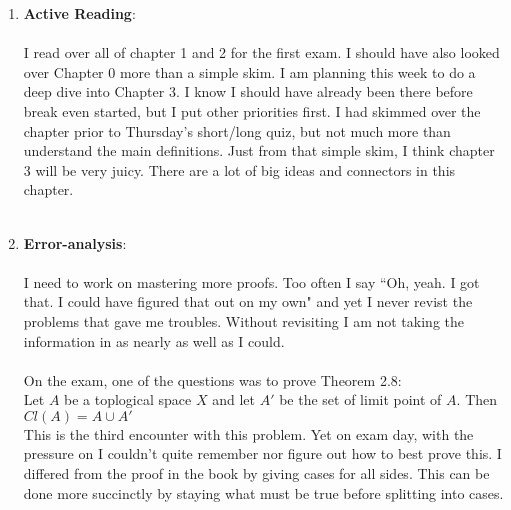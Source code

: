 \documentclass[10pt]{article}
\begin{document}
\begin{enumerate}

\item {\large {\bf Active Reading}}:  \\
\\
I read over all of chapter 1 and 2 for the first exam. I should have also looked over Chapter 0 more than a simple skim. I am planning this week to do a deep dive into Chapter 3. I know I should have already been there before break even started, but I put other priorities first. I had skimmed over the chapter prior to Thursday's short/long quiz, but not much more than understand the main definitions. Just from that simple skim, I think chapter 3 will be very juicy. There are a lot of big ideas and connectors in this chapter.\\
\\
\item {\large {\bf Error-analysis}}:\\
\\
I need to work on mastering more proofs. Too often I say ``Oh, yeah. I got that. I could have figured that out on my own" and yet I never revist the problems that gave me troubles. Without revisiting I am not taking the information in as nearly as well as I could.\\
\\
On the exam, one of the questions was to prove Theorem 2.8:\\
 Let $ A $ be a toplogical space $ X $ and let $ A' $ be the set of limit point of $A$. Then $ Cl(A)=A\cup A' $\\
 This is the third encounter with this problem. Yet on exam day, with the pressure on I couldn't quite remember nor figure out how to best prove this. I differed from the proof in the book by giving cases for all sides. This can be done more succinctly by staying what must be true before splitting into cases.


\end{enumerate}
\end{document}
